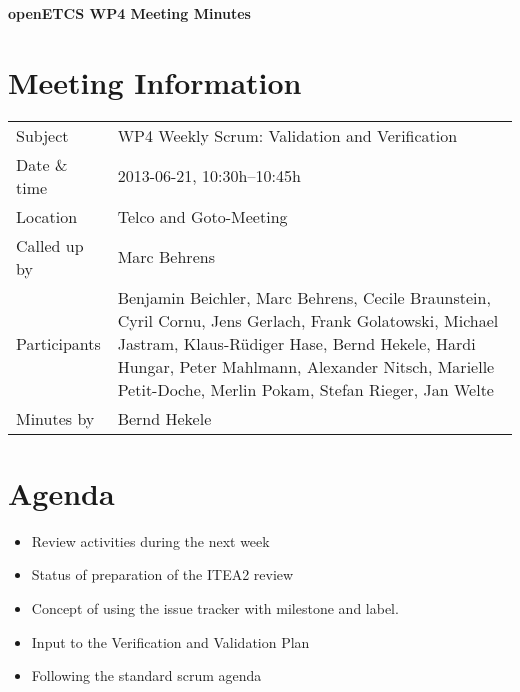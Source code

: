 \documentclass[a4paper, 11pt]{article}
\begin{document}
{\begin{center}\huge\bf openETCS WP4 Meeting Minutes\end{center}}
\section{Meeting Information}

\renewcommand{\arraystretch}{1.5}
\begin{supertabular}{m{.2\textwidth}m{.8\textwidth}}
Subject & WP4 Weekly Scrum: Validation and Verification\\
Date \& time & 2013-06-21, 10:30h--10:45h\\
Location & Telco and Goto-Meeting\\
Called up by & Marc Behrens\\
Participants &
Benjamin Beichler,
Marc Behrens,
Cecile Braunstein,
Cyril Cornu,
Jens Gerlach,
Frank Golatowski,
Michael Jastram,
Klaus-R\"udiger Hase,
Bernd Hekele,
Hardi Hungar,
Peter Mahlmann,
Alexander Nitsch,
Marielle Petit-Doche,
Merlin Pokam,
Stefan Rieger,
Jan Welte
\\

Minutes by & Bernd Hekele\\

\end{supertabular}
\renewcommand{\arraystretch}{1.0}


\section{{Agenda}}
\begin{itemize}
\item Review activities during the next week
\item Status of preparation of the ITEA2 review
\item Concept of using the issue tracker with milestone and label.
\item Input to the Verification and Validation Plan
\item Following the standard scrum agenda
\end{itemize}
\end{document}
